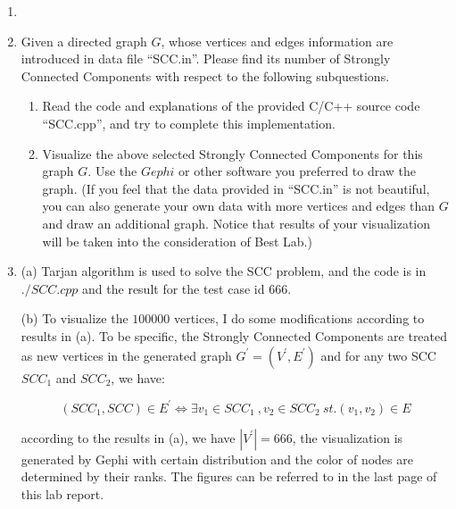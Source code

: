 \documentclass[12pt,a4paper]{article}
\makeatletter
\newtheorem*{solution}{Solution}
\theoremstyle{definition}
\renewenvironment{solution}[1][Solution] {\par\pushQED{\qed}\normalfont\topsep6\p@\@plus6\p@\relax\trivlist\item[\hskip\labelsep\bfseries#1\@addpunct{.}]\ignorespaces}{\popQED\endtrivlist\@endpefalse} \makeatother
\makeatother
\begin{document}
\begin{enumerate}
\begin{solution}
\begin{minipage}[t]{0.90\textwidth}
\begin{algorithm}[H]
{{					

				}
			}
		
			\;
			
		\end{algorithm}
	\end{minipage}
    \end{solution}

	\item Given a directed graph $G$, whose vertices and edges information are introduced in data file ``SCC.in''. Please find its number of Strongly Connected Components with respect to the following subquestions.
    \begin{enumerate}
    	\item Read the code and explanations of the provided C/C++ source code ``SCC.cpp'', and try to complete this implementation.
    	\item Visualize the above selected Strongly Connected Components for this graph $G$. Use the $Gephi$ or other software you preferred to draw the graph. {\color{blue}(If you feel that the data provided in ``SCC.in'' is not beautiful, you can also generate your own data with more vertices and edges than $G$ and draw an additional graph. Notice that results of your visualization will be taken into the consideration of Best Lab.)}

    \end{enumerate}
    \begin{solution}
		(a) Tarjan algorithm is used to solve the SCC problem, and the code is in $./SCC.cpp$ and the result for the test case id $666$.
		
		(b) To visualize the $100000$ vertices, I do some modifications according to results in (a). To be specific, the Strongly Connected Components are treated as new vertices in the generated graph $G^{'} = (V^{'}, E^{'})$ and for any two SCC $SCC_1$ and $SCC_2$, we have:

		\begin{equation*}
			(SCC_1, SCC) \in E^{'}  \Leftrightarrow \exists v_1 \in SCC_1 ~ , v_2 \in SCC_2 ~ st. (v_1, v_2) \in E
		\end{equation*}
	  

		according to the results in (a), we have $|V^{'}| = 666$, the visualization is generated by Gephi with certain distribution and the color of nodes are determined by their ranks. The figures can be referred to in the last page 
		of this lab report.
		


\end{solution}
\end{enumerate}
\end{document}

